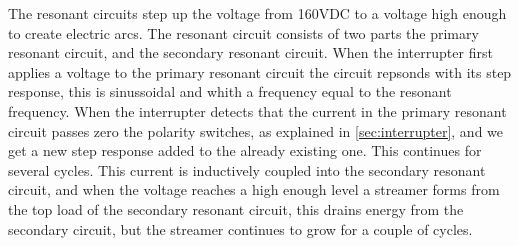The resonant circuits step up the voltage from 160VDC to a voltage high enough to create electric arcs. The resonant circuit consists of two parts the primary resonant circuit, and the secondary resonant circuit. When the interrupter first applies a voltage to the primary resonant circuit the circuit repsonds with its step response, this is sinussoidal and whith a frequency equal to the resonant frequency. When the interrupter detects that the current in the primary resonant circuit passes zero the polarity switches, as explained in \cref{sec:interrupter}, and we get a new step response added to the already existing one. This continues for several cycles. This current is inductively coupled into the secondary resonant circuit, and when the voltage reaches a high enough level a streamer forms from the top load of the secondary resonant circuit, this drains energy from the secondary circuit, but the streamer continues to grow for a couple of cycles.


\newpage